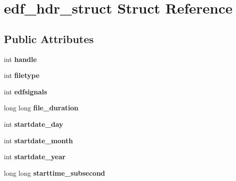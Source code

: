 \hypertarget{structedf__hdr__struct}{}\section{edf\+\_\+hdr\+\_\+struct Struct Reference}
\label{structedf__hdr__struct}
\subsection*{Public Attributes}
\begin{DoxyCompactItemize}
\item 
\hypertarget{structedf__hdr__struct_a86d6883d980ab822c9814e930c898e1e}{}int {\bfseries handle}\label{structedf__hdr__struct_a86d6883d980ab822c9814e930c898e1e}

\item 
\hypertarget{structedf__hdr__struct_ae67b3a4f017745f7f8ed78ac70e4d0b0}{}int {\bfseries filetype}\label{structedf__hdr__struct_ae67b3a4f017745f7f8ed78ac70e4d0b0}

\item 
\hypertarget{structedf__hdr__struct_a6369c5f44f17b347acafa7cd8b8932c3}{}int {\bfseries edfsignals}\label{structedf__hdr__struct_a6369c5f44f17b347acafa7cd8b8932c3}

\item 
\hypertarget{structedf__hdr__struct_a1f787ab1f7fa7f39b597cd956a895c66}{}long long {\bfseries file\+\_\+duration}\label{structedf__hdr__struct_a1f787ab1f7fa7f39b597cd956a895c66}

\item 
\hypertarget{structedf__hdr__struct_ad5c3ce50afc8389a887af60e2092d256}{}int {\bfseries startdate\+\_\+day}\label{structedf__hdr__struct_ad5c3ce50afc8389a887af60e2092d256}

\item 
\hypertarget{structedf__hdr__struct_a2ff9b0837abc454fb99ba33a23576d6a}{}int {\bfseries startdate\+\_\+month}\label{structedf__hdr__struct_a2ff9b0837abc454fb99ba33a23576d6a}

\item 
\hypertarget{structedf__hdr__struct_afe3123ab88d47c0549fa4af0bd8da7a6}{}int {\bfseries startdate\+\_\+year}\label{structedf__hdr__struct_afe3123ab88d47c0549fa4af0bd8da7a6}

\item 
\hypertarget{structedf__hdr__struct_a71a5bc94fde996278df8548d0f96fd15}{}long long {\bfseries starttime\+\_\+subsecond}\label{structedf__hdr__struct_a71a5bc94fde996278df8548d0f96fd15}


\end{DoxyCompactItemize}
